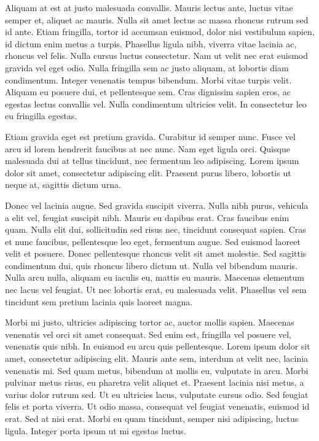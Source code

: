 Aliquam at est at justo malesuada convallis. Mauris lectus ante, luctus vitae semper et, aliquet ac mauris. Nulla sit amet lectus ac massa rhoncus rutrum sed id ante. Etiam fringilla, tortor id accumsan euismod, dolor nisi vestibulum sapien, id dictum enim metus a turpis. Phasellus ligula nibh, viverra vitae lacinia ac, rhoncus vel felis. Nulla cursus luctus consectetur. Nam ut velit nec erat euismod gravida vel eget odio. Nulla fringilla sem ac justo aliquam, at lobortis diam condimentum. Integer venenatis tempus bibendum. Morbi vitae turpis velit. Aliquam eu posuere dui, et pellentesque sem. Cras dignissim sapien eros, ac egestas lectus convallis vel. Nulla condimentum ultricies velit. In consectetur leo eu fringilla egestas. 

Etiam gravida eget est pretium gravida. Curabitur id semper nunc. Fusce vel arcu id lorem hendrerit faucibus at nec nunc. Nam eget ligula orci. Quisque malesuada dui at tellus tincidunt, nec fermentum leo adipiscing. Lorem ipsum dolor sit amet, consectetur adipiscing elit. Praesent purus libero, lobortis ut neque at, sagittis dictum urna.

Donec vel lacinia augue. Sed gravida suscipit viverra. Nulla nibh purus, vehicula a elit vel, feugiat suscipit nibh. Mauris eu dapibus erat. Cras faucibus enim quam. Nulla elit dui, sollicitudin sed risus nec, tincidunt consequat sapien. Cras et nunc faucibus, pellentesque leo eget, fermentum augue. Sed euismod laoreet velit et posuere. Donec pellentesque rhoncus velit sit amet molestie. Sed sagittis condimentum dui, quis rhoncus libero dictum ut. Nulla vel bibendum mauris. Nulla arcu nulla, aliquam eu iaculis eu, mattis eu mauris. Maecenas elementum nec lacus vel feugiat. Ut nec lobortis erat, eu malesuada velit. Phasellus vel sem tincidunt sem pretium lacinia quis laoreet magna.

Morbi mi justo, ultricies adipiscing tortor ac, auctor mollis sapien. Maecenas venenatis vel orci sit amet consequat. Sed enim est, fringilla vel posuere vel, venenatis quis nibh. In euismod eu arcu quis pellentesque. Lorem ipsum dolor sit amet, consectetur adipiscing elit. Mauris ante sem, interdum at velit nec, lacinia venenatis mi. Sed quam metus, bibendum at mollis eu, vulputate in arcu. Morbi pulvinar metus risus, eu pharetra velit aliquet et. Praesent lacinia nisi metus, a varius dolor rutrum sed. Ut eu ultricies lacus, vulputate cursus odio. Sed feugiat felis et porta viverra. Ut odio massa, consequat vel feugiat venenatis, euismod id erat. Sed at nisi erat. Morbi eu quam tincidunt, semper nisi adipiscing, luctus ligula. Integer porta ipsum ut mi egestas luctus.

